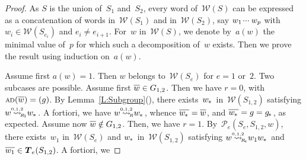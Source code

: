 \documentclass{amsart}
\numberwithin{equation}{section}
\theoremstyle{plain}
\theoremstyle{definition}
\newcounter{ITEM}
\begin{document}
\begin{proof}
As ${S}$ is the union of~${S}_1$ and~${S}_2$, every word of~${\mathcal{W}({S})}$ can be expressed as a concatenation of words in~${\mathcal{W}({{S}_1})}$ and in~${\mathcal{W}({{S}_2})}$, say ${w}_1 {\hspace{0.2ex}{\cdot}{\cdot}{\cdot}\hspace{0.5ex}} {w}_{p}$ with ${w}_{i} \in {\mathcal{W}({{S}_{{e}_{i}}})}$ and ${e}_{i} \not= {e}_{{i}+1}$. For~${w}$ in~${\mathcal{W}({S})}$, we denote by~${a({w})}$ the minimal value of~${p}$ for which such a decomposition of~${w}$ exists. Then we prove the result using induction on~${a({w})}$.

Assume first ${a({w})} = 1$. Then ${w}$ belongs to~${\mathcal{W}({{S}_{e}})}$ for ${e} = 1$ or~$2$. Two subcases are possible. Assume first ${\overline{\vrule width0pt height5pt{w}}} \in {G}_{1,2}$. Then we have ${r} = 0$, with ${{\scriptstyle\mathrm{A\hspace{-0.1ex}D}}({{\overline{\vrule width0pt height5pt{w}}}})} = ({g})$. By Lemma~\ref{L:Subgroup}{\setcounter{ITEM}{2}\leavevmode\hbox{\rm()}}, there exists~${{w}_{\hspace{-0.1ex}*\hspace{0.2ex}}}$ in~${\mathcal{W}({{S}_{1,2}})}$ satisfying ${w} {\mathrel{{\mathrel{\overset{\scriptscriptstyle 0,1,2}{\rightsquigarrow}}}_{\hspace{-0.9ex}{\scriptscriptstyle R}_{\hspace{-0.2ex}1}}}} {{w}_{\hspace{-0.1ex}*\hspace{0.2ex}}}$. A fortiori, we have ${w} {\mathrel{{\mathrel{\overset{\scriptscriptstyle 0,1,2}{\rightsquigarrow}}}_{\hspace{-0.9ex}{\scriptscriptstyle R}}}} {{w}_{\hspace{-0.1ex}*\hspace{0.2ex}}}$, whence ${\overline{\vrule width0pt height5pt{{w}_{\hspace{-0.1ex}*\hspace{0.2ex}}}}} = {\overline{\vrule width0pt height5pt{w}}}$, and ${\overline{\vrule width0pt height5pt{{w}_{\hspace{-0.1ex}*\hspace{0.2ex}}}}} = {g} = {{g}_{\hspace{-0.2ex}*\hspace{0.2ex}}}$, as expected. Assume now ${\overline{\vrule width0pt height5pt{w}}} \notin {G}_{1,2}$. Then, we have ${r} = 1$. By~${\mathcal{P}_{\!e}({{S}_{e}}, {{S}_{1,2}}, {w})}$, there exists~${w}_1$ in~${\mathcal{W}({{S}_{e}})}$ and ${{w}_{\hspace{-0.1ex}*\hspace{0.2ex}}}$ in~${\mathcal{W}({{S}_{1,2}})}$ satisfying ${w} {\mathrel{{\mathrel{\overset{\scriptscriptstyle 0,1,2}{\rightsquigarrow}}}_{\hspace{-0.9ex}{\scriptscriptstyle R}_{\hspace{-0.2ex}e}}}} {w}_1 {{w}_{\hspace{-0.1ex}*\hspace{0.2ex}}}$ and ${\overline{\vrule width0pt height5pt{{w}_1}}} \in {\boldsymbol{T}}_{e}({S}_{1,2})$. A fortiori, we 
\end{proof}
\end{document}

